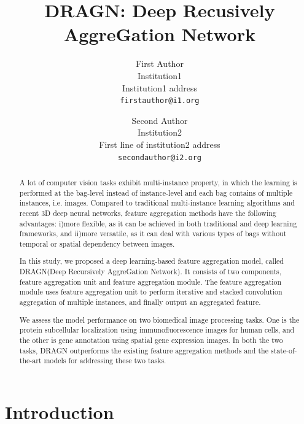 \documentclass[10pt,twocolumn,letterpaper]{article}
\begin{document}
\title{DRAGN: Deep Recusively AggreGation Network}

\author{First Author\\
Institution1\\
Institution1 address\\
{\tt\small firstauthor@i1.org}
\and
Second Author\\
Institution2\\
First line of institution2 address\\
{\tt\small secondauthor@i2.org}
}

\maketitle

\begin{abstract}
A lot of computer vision tasks exhibit multi-instance property, in which the learning is performed at the bag-level instead of instance-level and each bag contains of multiple instances, i.e. images. Compared to traditional multi-instance learning algorithms and recent 3D deep neural networks, feature aggregation methods have the following advantages: i)more flexible, as it can be achieved in both traditional and deep learning frameworks, and ii)more versatile, as it can deal with various types of bags without temporal or spatial dependency between images.

In this study, we proposed a deep learning-based feature aggregation model, called DRAGN(Deep Recursively AggreGation Network). It consists of two components, feature aggregation unit and feature aggregation module. The feature aggregation module uses feature aggregation unit to perform iterative and stacked convolution aggregation of multiple instances, and finally output an aggregated feature.

We assess the model performance on two biomedical image processing tasks. One is the protein subcellular localization using immunofluorescence images for human cells, and the other is gene annotation using spatial gene expression images. In both the two tasks, DRAGN outperforms the existing feature aggregation methods and the state-of-the-art models for addressing these two tasks.

\end{abstract}

\section{Introduction}
\end{document}
